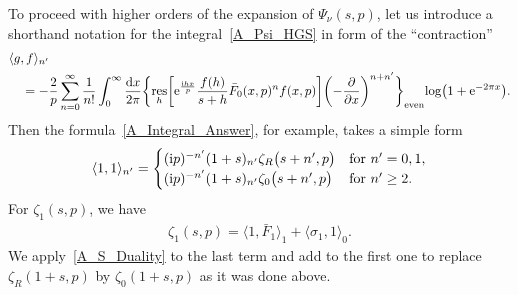 \documentclass[10pt,a4paper]{amsart}
\numberwithin{equation}{section}
\DeclareMathOperator{\res}{res}
\begin{document}
To proceed with higher orders of the expansion of $\Psi_\nu(s, p)$, let us introduce a shorthand notation for the integral~\eqref{A_Psi_HGS} in form of the ``contraction''
\begin{align*}%
&\langle g, f \rangle_{n'} \\
&\quad{}=-\frac{2}{p} \sum_{n=0}^{\infty} \frac{1}{n!} \int_{0}^{\infty} \frac{{\rm d}x}{2\pi}
    \biggl\{
        \res_h\biggl[{\rm e}^{\frac{{\rm i}hx}{p}} \frac{f(h)}{s+h} \bar{F}_0(x, p)^n f(x, p)\biggr]
        \biggl(-\frac{\partial}{\partial x}\biggr)^{n+n'}
    \biggr\}_{\text{even}} \!\log\bigl(1+{\rm e}^{-2\pi x}\bigr). \nonumber
\end{align*}
Then the formula~\eqref{A_Integral_Answer}, for example, takes a simple form
\begin{align*}
\langle 1, 1 \rangle_{n'} =
\begin{cases}
({\rm i}p)^{-n'} (1+s)_{n'} \zeta_{R}\bigl(s+n', p\bigr) & \text{for } n'=0, 1, \\
({\rm i}p)^{-n'} (1+s)_{n'} \zeta_{0}\bigl(s+n', p\bigr) & \text{for } n'\geq 2.
\end{cases}
\end{align*}
For $\zeta_1(s, p)$, we have
\begin{align*}
\zeta_1(s, p)=\bigl\langle 1, \bar{F}_1\bigr\rangle_1 + \langle \sigma_1, 1 \rangle_0.
\end{align*}
We apply~\eqref{A_S_Duality} to the last term and add to the first one to replace $\zeta_R(1+s, p)$ by $\zeta_0(1+s, p)$ as it was done above.
\end{document}
